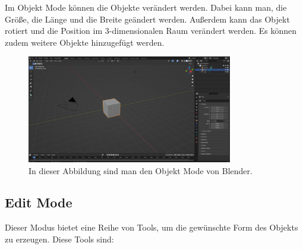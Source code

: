 Im Objekt Mode können die Objekte verändert werden.
Dabei kann man, die Größe, die Länge und die Breite geändert werden.
Außerdem kann das Objekt rotiert und die Position im 3-dimensionalen Raum verändert werden. 
Es können zudem weitere Objekte hinzugefügt werden.
\begin{figure}[H]
    \centering
    \includegraphics[width=0.8\textwidth]{chapters/13/images/3D-Viewport.png}
    \caption{In dieser Abbildung sind man den Objekt Mode von Blender.}
    \label{UST-8}
\end{figure}


\subsection{Edit Mode}
Dieser Modus bietet eine Reihe von Tools, um die gewünschte Form des Objekts zu erzeugen.
Diese Tools sind:



